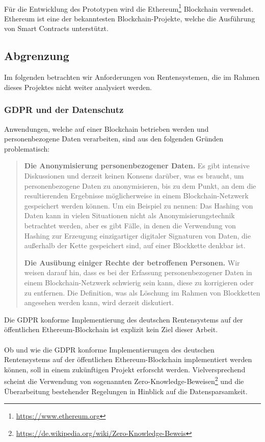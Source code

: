 \paragraph*{}
Für die Entwicklung des Prototypen wird die Ethereum\footnote{\url{https://www.ethereum.org}} Blockchain verwendet. Ethereum ist eine der bekanntesten Blockchain-Projekte, welche die Ausführung von Smart Contracts unterstützt.

\subsection{Abgrenzung}
Im folgenden betrachten wir Anforderungen von Rentensystemen, die im Rahmen dieses Projektes nicht weiter analysiert werden.

\subsubsection{GDPR und der Datenschutz}
Anwendungen, welche auf einer Blockchain betrieben werden und personenbezogene Daten verarbeiten, sind aus den folgenden Gründen problematisch:

\begin{quote}
\textbf{Die Anonymisierung personenbezogener Daten.} Es gibt intensive Diskussionen und derzeit keinen Konsens darüber, was es braucht, um personenbezogene Daten zu anonymisieren, bis zu dem Punkt, an dem die resultierenden Ergebnisse möglicherweise in einem Blockchain-Netzwerk gespeichert werden können. Um ein Beispiel zu nennen: Das Hashing von Daten kann in vielen Situationen nicht als Anonymisierungstechnik betrachtet werden, aber es gibt Fälle, in denen die Verwendung von Hashing zur Erzeugung einzigartiger digitaler Signaturen von Daten, die außerhalb der Kette gespeichert sind, auf einer Blockkette denkbar ist.

\textbf{Die Ausübung einiger Rechte der betroffenen Personen.} Wir weisen darauf hin, dass es bei der Erfassung personenbezogener Daten in einem Blockchain-Netzwerk schwierig sein kann, diese zu korrigieren oder zu entfernen. Die Definition, was als Löschung im Rahmen von Blockketten angesehen werden kann, wird derzeit diskutiert.\cite{gdpr}
\end{quote}

Die GDPR konforme Implementierung des deutschen Rentensystems auf der öffentlichen Ethereum-Blockchain ist explizit kein Ziel dieser Arbeit.

\paragraph*{}
Ob und wie die GDPR konforme Implementierungen des deutschen Rentensystems auf der öffentlichen Ethereum-Blockchain implementiert werden können, soll in einem zukünftigen Projekt erforscht werden. Vielversprechend scheint die Verwendung von sogenannten Zero-Knowledge-Beweisen\footnote{\url{https://de.wikipedia.org/wiki/Zero-Knowledge-Beweis}} und die Überarbeitung bestehender Regelungen in Hinblick auf die Datensparsamkeit.

